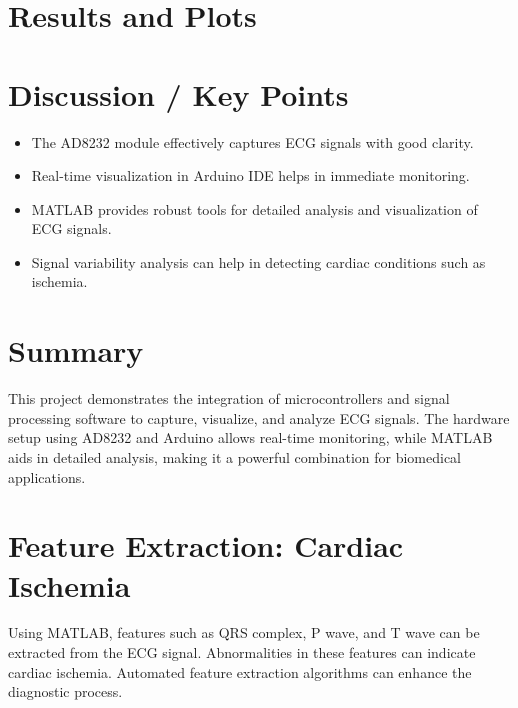 \documentclass[12pt]{article}
\begin{document}
\section{Results and Plots}


\section{Discussion / Key Points}
\begin{itemize}
    \item The AD8232 module effectively captures ECG signals with good clarity.
    \item Real-time visualization in Arduino IDE helps in immediate monitoring.
    \item MATLAB provides robust tools for detailed analysis and visualization of ECG signals.
    \item Signal variability analysis can help in detecting cardiac conditions such as ischemia.
\end{itemize}

\section{Summary}
This project demonstrates the integration of microcontrollers and signal processing software to capture, visualize, and analyze ECG signals. The hardware setup using AD8232 and Arduino allows real-time monitoring, while MATLAB aids in detailed analysis, making it a powerful combination for biomedical applications.

\section{Feature Extraction: Cardiac Ischemia}
Using MATLAB, features such as QRS complex, P wave, and T wave can be extracted from the ECG signal. Abnormalities in these features can indicate cardiac ischemia. Automated feature extraction algorithms can enhance the diagnostic process.
\end{document}
